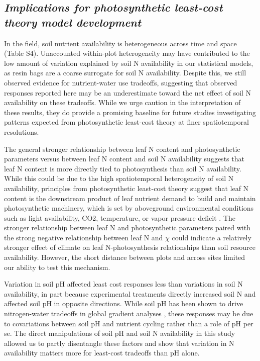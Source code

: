 \subsection{\textit{Implications for photosynthetic least-cost theory model development}}
In the field, soil nutrient availability is heterogeneous across time and space (Table S4). Unaccounted within-plot heterogeneity may have contributed to the low amount of variation explained by soil N availability in our statistical models, as resin bags are a coarse surrogate for soil N availability. Despite this, we still observed evidence for nutrient-water use tradeoffs, suggesting that observed responses reported here may be an underestimate toward the net effect of soil N availability on these tradeoffs. While we urge caution in the interpretation of these results, they do provide a promising baseline for future studies investigating patterns expected from photosynthetic least-cost theory at finer spatiotemporal resolutions.
    
The general stronger relationship between leaf N content and photosynthetic parameters versus between leaf N content and soil N availability suggests that leaf N content is more directly tied to photosynthesis than soil N availability. While this could be due to the high spatiotemporal heterogeneity of soil N availability, principles from photosynthetic least-cost theory suggest that leaf N content is the downstream product of leaf nutrient demand to build and maintain photosynthetic machinery, which is set by aboveground environmental conditions such as light availability, CO2, temperature, or vapor pressure deficit . The stronger relationship between leaf N and photosynthetic parameters paired with the strong negative relationship between leaf N and $\chi$ could indicate a relatively stronger effect of climate on leaf N-photosynthesis relationships than soil resource availability. However, the short distance between plots and across sites limited our ability to test this mechanism.
    
Variation in soil pH affected least cost responses less than variations in soil N availability, in part because experimental treatments directly increased soil N and affected soil pH in opposite directions. While soil pH has been shown to drive nitrogen-water tradeoffs in global gradient analyses , these responses may be due to covariations between soil pH and nutrient cycling rather than a role of pH per se. The direct manipulations of soil pH and soil N availability in this study allowed us to partly disentangle these factors and show that variation in N availability matters more for least-cost tradeoffs than pH alone.

